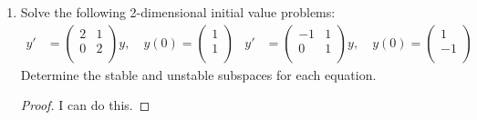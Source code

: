 \documentclass[../psets.tex]{subfiles}
\begin{document}
\begin{enumerate}
\begin{proof}
\begin{align*}
\begin{pmatrix}
                \e[\mu t] & t\e[\mu t]\\
                0 & \e[\mu t]\\
            \end{pmatrix}
        \end{align*}
        Thus, given a 2D vector function of $t$, we must check that either both entries are of the form $A\e[\lambda t]+B\e[\mu t]$ for some (possibly different between the entries) numbers $A,B\in\C$, or both entries are of the form $A\e[\mu t]+Bt\e[\mu t]$. Only the
        \begin{equation*}
            \boxed{\text{second and fifth}}
        \end{equation*}
        entries in the question have this form.
    \end{proof}
    \item Solve the following 2-dimensional initial value problems:
    \begin{align*}
        y' &=
        \begin{pmatrix}
            2 & 1\\
            0 & 2\\
        \end{pmatrix}
        y,\quad
        y(0) =
        \begin{pmatrix}
            1\\
            1\\
        \end{pmatrix}&
        y' &=
        \begin{pmatrix}
            -1 & 1\\
            0 & 1\\
        \end{pmatrix}
        y,\quad
        y(0) =
        \begin{pmatrix}
            1\\
            -1\\
        \end{pmatrix}&
    \end{align*}
    Determine the stable and unstable subspaces for each equation.
    \begin{proof}
        I can do this.
    \end{proof}
\end{enumerate}
\end{document}
